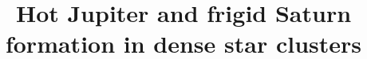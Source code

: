 \documentclass[twocolumn]{aastex63}
\begin{document}
\title{Hot Jupiter and frigid Saturn formation in dense star clusters}


\end{document}
